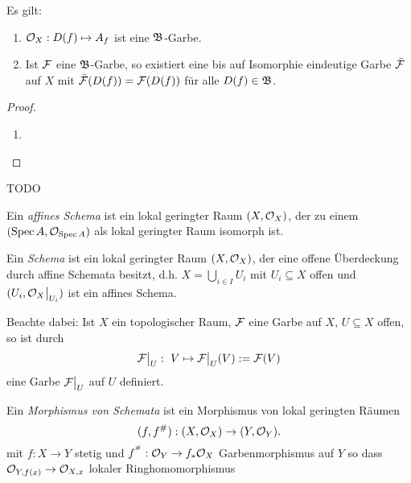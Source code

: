 \begin{hilfslemma}
	\label{hilfslemma:1}
	Es gilt:
	\begin{enumerate}
	  \item $\mathcal{O}_X: D(f) \mapsto A_f$ ist eine $\mathfrak B$-Garbe.
	  \item Ist $\mathcal{F}$ eine $\mathfrak B$-Garbe, so existiert eine bis auf
	  	Isomorphie eindeutige Garbe $\bar {\mathcal{F}}$ auf $X$ mit
	  	$\bar{\mathcal{F}}(D(f)) = \mathcal{F}(D(f))$ für alle $D(f) \in \mathfrak B$.
	\end{enumerate}
\end{hilfslemma}
\begin{proof}
	\begin{enumerate}
	  \item 
	\end{enumerate}
\end{proof}


 TODO
 
 
\begin{definition}
	Ein \emph{affines Schema} ist ein lokal geringter Raum
	$(X,\mathcal{O}_X)$, der zu einem $(\operatorname{Spec} A, \mathcal{O}_{\operatorname{Spec} A})$ als lokal geringter
	Raum isomorph ist.
	
	Ein \emph{Schema} ist ein lokal geringter Raum $(X,\mathcal{O}_X)$, der eine
	offene Überdeckung durch affine Schemata besitzt, d.h.
	$X = \bigcup_{i\in I} U_i$ mit $U_i \subseteq X$ offen und 
	$(U_i, \mathcal{O}_X\big|_{U_i})$ ist ein affines Schema.
\end{definition}

\begin{bemerkung}
	Beachte dabei: Ist $X$ ein topologischer Raum, $\mathcal{F}$ eine Garbe auf $X$,
	$U\subseteq X$ offen, so ist durch
	\[
		\mathcal{F}\big|_{U}:\ V \mapsto \mathcal{F}\big|_{U} (V) := \mathcal{F}(V)
	\]
	eine Garbe $\mathcal{F}\big|_{U}$ auf $U$ definiert.
\end{bemerkung}

\begin{definition}
	Ein \emph{Morphismus von Schemata} ist ein
	Morphismus von lokal geringten Räumen
	\[
		(f,f^{\#}): (X, \mathcal{O}_X)  \to  (Y, \mathcal{O}_Y).
	\]
  mit $f:X \to Y$ stetig und $f^{^{\#}} : \mathcal{O}_Y \to f_*\mathcal{O}_X$ Garbenmorphismus
  auf $Y$ so dass $\mathcal{O}_{Y,f(x)}\to\mathcal{O}_{X,x}$ lokaler Ringhomomorphismus
\end{definition}

